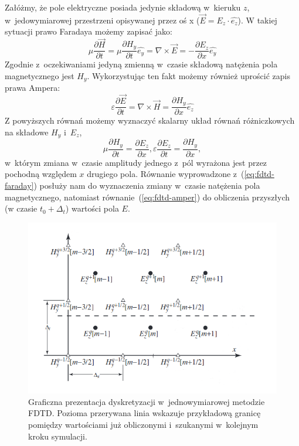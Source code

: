 Załóżmy, że pole elektryczne posiada jedynie składową w~kieruku $z$, w~jedowymiarowej przestrzeni opisywanej przez oś x ($\vec{E}=E_z \cdot \hat{e_z}$). W takiej sytuacji prawo Faradaya możemy zapisać jako:
\begin{equation}
\mu \frac{\partial \vec{H}}{\partial t}= \mu \frac{\partial H_y}{\partial t} \hat{e_y}= \nabla \times \vec{E} = - \frac{\partial E_z}{\partial x} \hat{e_y} 
\label{eq:fdtd-faraday}
\end{equation}
Zgodnie z~oczekiwaniami jedyną zmienną w~czasie składową natężenia pola magnetycznego jest $H_y$. Wykorzystując ten fakt możemy również uprościć zapis prawa Ampera:
\begin{equation}
\varepsilon \frac{\partial \vec{E}}{\partial t}=\nabla \times \vec{H} = \frac{\partial H_y}{\partial x} \hat{e_z}
\label{eq:fdtd-amper}
\end{equation}
Z powyższych równań możemy wyznaczyć skalarny układ równań różniczkowych na składowe $H_y$ i~$E_z$,
\begin{equation}
\mu \frac{\partial H_y}{\partial t}=\frac{\partial E_z}{\partial x} ,
\varepsilon \frac{\partial E_z}{\partial t}=\frac{\partial H_y}{\partial x},
\end{equation} w~którym zmiana w~czasie amplitudy jednego z~pól wyrażona jest przez pochodną względem $x$ drugiego pola. Równanie wyprowadzone z~(\ref{eq:fdtd-faraday}) posłuży nam do wyznaczenia zmiany w~czasie natężenia pola magnetycznego, natomiast równanie~(\ref{eq:fdtd-amper}) do obliczenia przyszłych (w czasie $t_0 + \Delta_t$) wartości pola $E$.

\begin{figure}[tb]
\includegraphics[width=.9\textwidth]{subart/fdtd/leapfrog.png}
\caption{Graficzna prezentacja dyskretyzacji w~jednowymiarowej metodzie FDTD. Pozioma przerywana linia wskazuje przykładową granicę pomiędzy wartościami już obliczonymi i~szukanymi w~kolejnym kroku symulacji. }
\label{pic:leapfrog}
\end{figure}

